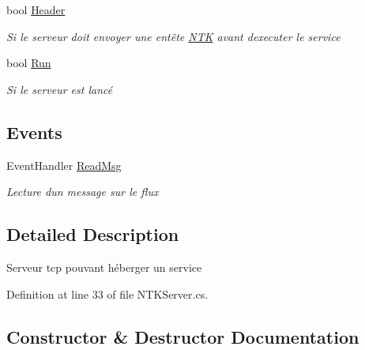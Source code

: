 \begin{DoxyCompactItemize}
\item 
bool \mbox{\hyperlink{class_n_t_k_1_1_n_t_k_server_a0f59045464675f975f77bbda6042c390}{Header}}
\begin{DoxyCompactList}\small\item\em Si le serveur doit envoyer une entête \mbox{\hyperlink{namespace_n_t_k}{N\+TK}} avant d\textquotesingle{}executer le service \end{DoxyCompactList}\item 
bool \mbox{\hyperlink{class_n_t_k_1_1_n_t_k_server_aa2366e0763f42b453394c5f082f79a02}{Run}}
\begin{DoxyCompactList}\small\item\em Si le serveur est lancé \end{DoxyCompactList}\end{DoxyCompactItemize}
\subsection*{Events}
\begin{DoxyCompactItemize}
\item 
Event\+Handler \mbox{\hyperlink{class_n_t_k_1_1_n_t_k_server_a2261cd274407c3c06daa569c09f5119a}{Read\+Msg}}
\begin{DoxyCompactList}\small\item\em Lecture d\textquotesingle{}un message sur le flux \end{DoxyCompactList}\end{DoxyCompactItemize}


\subsection{Detailed Description}
Serveur tcp pouvant héberger un service 



Definition at line 33 of file N\+T\+K\+Server.\+cs.



\subsection{Constructor \& Destructor Documentation}
\mbox{\label{class_n_t_k_1_1_n_t_k_server_a32ce62eba342ab051bce35ccc0c0add6}} 
